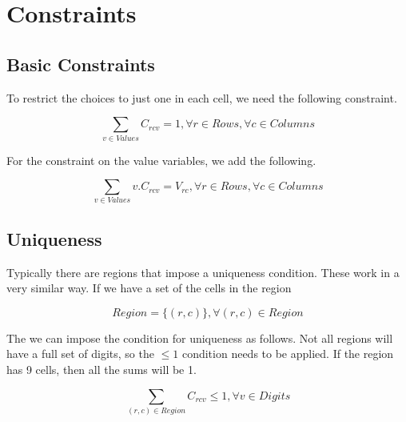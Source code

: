\documentclass{article}
\begin{document}
\section{Constraints}


\subsection{Basic Constraints}

To restrict the choices to just one in each cell, we need the following constraint.

\begin{equation}
\sum_{v \in Values} C_{rcv} = 1 , \forall r \in Rows, \forall c \in Columns
\end{equation}

For the constraint on the value variables, we add the following.

\begin{equation}
\sum_{v \in Values} v. C_{rcv} = V_{rc} ,  \forall r\in Rows, \forall c \in Columns
\end{equation}


\subsection{Uniqueness}

Typically there are regions that impose a uniqueness condition. These work in a very similar way. If we have a set of the cells in the region

\begin{equation}
Region=\lbrace (r, c) \rbrace,  \forall (r, c) \in Region
\end{equation}

The we can impose the condition for uniqueness as follows.  Not all regions will have a full set of digits, so the \( \leq 1 \) condition needs to be applied. 
If the region has 9 cells, then all the sums will be 1. 

\begin{equation}
\sum_{ (r,c) \in Region} C_{rcv} \leq 1 , \forall v\in Digits
\end{equation}

\end{document}
